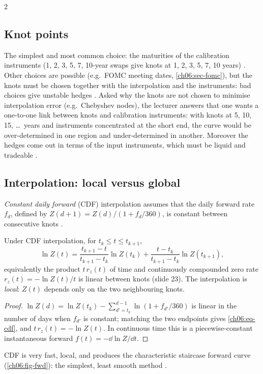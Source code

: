 \begin{paracol}{2}
\subsection{Knot points}
The simplest and most common choice: the maturities of the calibration instruments (1, 2, 3, 5, 7, 10-year swaps
give knots at 1, 2, 3, 5, 7, 10 years) . Other choices are possible (e.g.\ FOMC meeting dates,
\cref{ch06:sec-fomc}), but the knots must be chosen together with the interpolation and the instruments: bad choices
give unstable hedges . Asked why the knots are not chosen to minimise interpolation error (e.g.\
Chebyshev nodes), the lecturer answers that one wants a one-to-one link between knots and calibration instruments:
with knots at 5, 10, 15, \dots\ years and instruments concentrated at the short end, the curve would be
over-determined in one region and under-determined in another. Moreover the hedges come out in terms of the input
instruments, which must be liquid and tradeable \ts{24}{7}{45:19}.

\subsection{Interpolation: local versus global}
\begin{definition}\label{ch06:def-cdf}
\emph{Constant daily forward} (CDF) interpolation assumes that the daily forward rate
$f_d$, defined by $Z(d+1)=Z(d)/(1+f_d/360)$, is constant between consecutive knots .
\end{definition}

\begin{proposition}[CDF $=$ log-linear discount factors]\label{ch06:prop-cdf}
Under CDF interpolation, for $t_k\le t\le t_{k+1}$,
\begin{equation}\label{ch06:eq-cdf}
  \ln Z(t)=\frac{t_{k+1}-t}{t_{k+1}-t_k}\ln Z(t_k)+\frac{t-t_k}{t_{k+1}-t_k}\ln Z(t_{k+1}),
\end{equation}
equivalently the product $t\,r_z(t)$ of time and continuously compounded zero rate $r_z(t)=-\ln Z(t)/t$ is
linear between knots (slide 23). The interpolation is \emph{local}: $Z(t)$ depends only on the two neighbouring
knots.
\end{proposition}
\begin{proof}
$\ln Z(d)=\ln Z(t_k)-\sum_{d'=t_k}^{d-1}\ln(1+f_{d'}/360)$ is linear in the number of days when $f_{d'}$ is
constant; matching the two endpoints gives \eqref{ch06:eq-cdf}, and $t\,r_z(t)=-\ln Z(t)$. In continuous time
this is a piecewise-constant instantaneous forward $f(t)=-\dd\ln Z/\dd t$.
\end{proof}
CDF is very fast, local, and produces the characteristic staircase forward curve (\cref{ch06:fig-fwd}): the
simplest, least smooth method \ts{24}{7}{46:21}.


\end{paracol}
